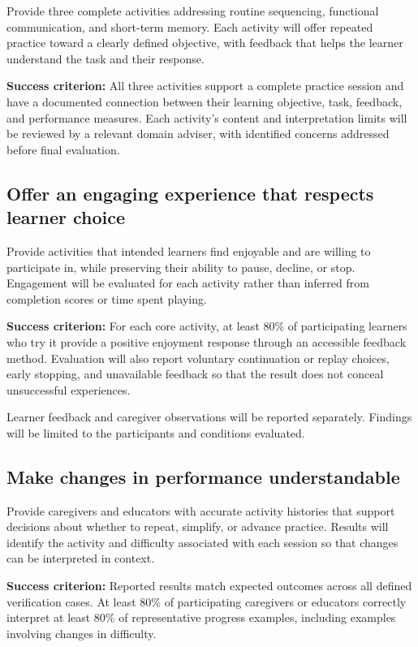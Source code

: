 \documentclass{article}
\begin{document}
Provide three complete activities addressing routine sequencing, functional
communication, and short-term memory. Each activity will offer repeated practice
toward a clearly defined objective, with feedback that helps the learner
understand the task and their response.

\textbf{Success criterion:} All three activities support a complete practice
session and have a documented connection between their learning objective, task,
feedback, and performance measures. Each activity's content and interpretation
limits will be reviewed by a relevant domain adviser, with identified concerns
addressed before final evaluation.

\subsection{Offer an engaging experience that respects learner choice}

Provide activities that intended learners find enjoyable and are willing to
participate in, while preserving their ability to pause, decline, or stop.
Engagement will be evaluated for each activity rather than inferred from
completion scores or time spent playing.

\textbf{Success criterion:} For each core activity, at least 80\% of
participating learners who try it provide a positive enjoyment response through
an accessible feedback method. Evaluation will also report voluntary
continuation or replay choices, early stopping, and unavailable feedback so that
the result does not conceal unsuccessful experiences.

Learner feedback and caregiver observations will be reported separately.
Findings will be limited to the participants and conditions evaluated.

\subsection{Make changes in performance understandable}

Provide caregivers and educators with accurate activity histories that support
decisions about whether to repeat, simplify, or advance practice. Results will
identify the activity and difficulty associated with each session so that
changes can be interpreted in context.

\textbf{Success criterion:} Reported results match expected outcomes across all
defined verification cases. At least 80\% of participating caregivers or
educators correctly interpret at least 80\% of representative progress examples,
including examples involving changes in difficulty.
\end{document}
